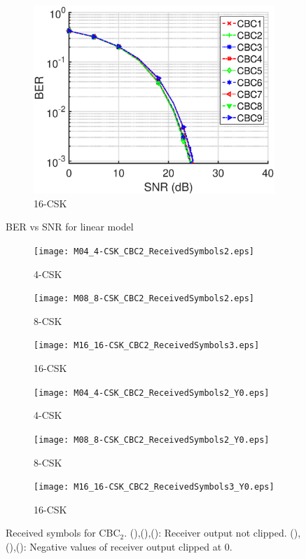 \documentclass[10pt,letterpaper]{article}
\begin{document}
\begin{figure}[b]
\begin{subfigure}{0.49\textwidth}
		\centering
			\includegraphics[trim={0.1in 0.0in 0.6in 0.3in}, clip=true, width=\textwidth]{M16_16-CSK_BERvsSNR.eps}
			\caption{16-CSK}
			\label{fig16SNR}
		\end{subfigure}
	\caption{BER vs SNR for linear model}
	\label{figBERvsSNR}
\end{figure}

\begin{figure}[b]
	\centering
		\begin{subfigure}{0.32\textwidth}
		\centering
			\texttt{[image: M04\_4-CSK\_CBC2\_ReceivedSymbols2.eps]}
			\caption{4-CSK}
			\label{fig4RcvSym}
		\end{subfigure}
		\begin{subfigure}{0.32\textwidth}
		\centering
			\texttt{[image: M08\_8-CSK\_CBC2\_ReceivedSymbols2.eps]}
			\caption{8-CSK}
			\label{fig8RcvSym}
		\end{subfigure}
		\begin{subfigure}{0.32\textwidth}
		\centering
			\texttt{[image: M16\_16-CSK\_CBC2\_ReceivedSymbols3.eps]}
			\caption{16-CSK}
			\label{fig16RcvSym}
		\end{subfigure}
		\begin{subfigure}{0.32\textwidth}
		\centering
			\texttt{[image: M04\_4-CSK\_CBC2\_ReceivedSymbols2\_Y0.eps]}
			\caption{4-CSK}
			\label{fig4RcvSymY0}
		\end{subfigure}
		\begin{subfigure}{0.32\textwidth}
		\centering
			\texttt{[image: M08\_8-CSK\_CBC2\_ReceivedSymbols2\_Y0.eps]}
			\caption{8-CSK}
			\label{fig8RcvSymY0}
		\end{subfigure}
		\begin{subfigure}{0.32\textwidth}
		\centering
			\texttt{[image: M16\_16-CSK\_CBC2\_ReceivedSymbols3\_Y0.eps]}
			\caption{16-CSK}
			\label{fig16RcvSymY0}
		\end{subfigure}
	\caption{Received symbols for CBC$_{2}$. (),(),(): Receiver output not clipped. (),(),(): Negative values of receiver output clipped at 0.}
	\label{figRcvSym}
\end{figure}
\end{document}
